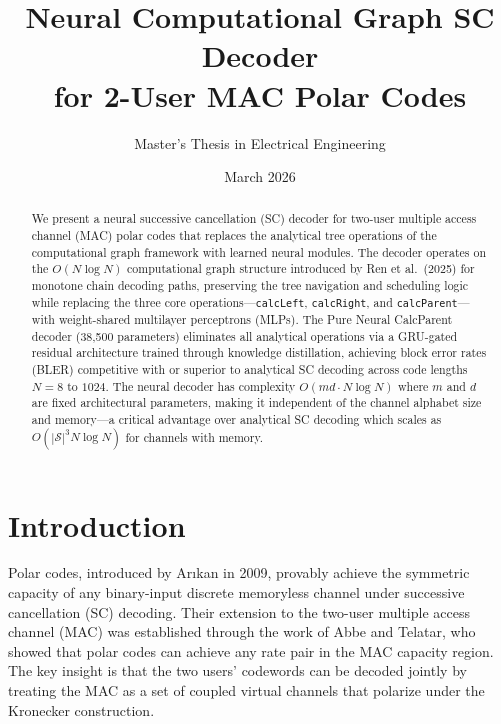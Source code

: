 \documentclass[11pt,a4paper]{article}
\title{\textbf{Neural Computational Graph SC Decoder\\for 2-User MAC Polar Codes}}
\author{Master's Thesis in Electrical Engineering}
\date{March 2026}
\begin{document}
\maketitle

\begin{abstract}
We present a neural successive cancellation (SC) decoder for two-user multiple access channel (MAC) polar codes that replaces the analytical tree operations of the computational graph framework with learned neural modules. The decoder operates on the $O(N \log N)$ computational graph structure introduced by Ren et al.\ (2025) for monotone chain decoding paths, preserving the tree navigation and scheduling logic while replacing the three core operations---\texttt{calcLeft}, \texttt{calcRight}, and \texttt{calcParent}---with weight-shared multilayer perceptrons (MLPs). The Pure Neural CalcParent decoder (38,500 parameters) eliminates all analytical operations via a GRU-gated residual architecture trained through knowledge distillation, achieving block error rates (BLER) competitive with or superior to analytical SC decoding across code lengths $N = 8$ to $1024$. The neural decoder has complexity $O(md \cdot N \log N)$ where $m$ and $d$ are fixed architectural parameters, making it independent of the channel alphabet size and memory---a critical advantage over analytical SC decoding which scales as $O(|\mathcal{S}|^3 N \log N)$ for channels with memory.
\end{abstract}

\newpage
\tableofcontents
\newpage

\section{Introduction}
\label{sec:introduction}

Polar codes, introduced by Ar{\i}kan in 2009, provably achieve the symmetric capacity of any binary-input discrete memoryless channel under successive cancellation (SC) decoding. Their extension to the two-user multiple access channel (MAC) was established through the work of Abbe and Telatar, who showed that polar codes can achieve any rate pair in the MAC capacity region. The key insight is that the two users' codewords can be decoded jointly by treating the MAC as a set of coupled virtual channels that polarize under the Kronecker construction.
\end{document}
